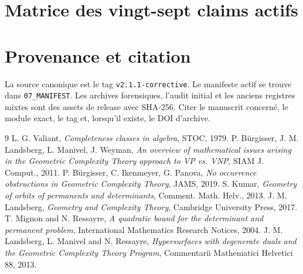 \documentclass[10pt]{article}
\begin{document}
\section{Matrice des vingt-sept claims actifs}
\small

\normalsize

\section{Provenance et citation}
La source canonique est le tag \texttt{v2.1.1-corrective}. Le manifeste actif se trouve dans \texttt{07\_MANIFEST}. Les archives forensiques, l'audit initial et les anciens registres mixtes sont des assets de release avec SHA-256. Citer le manuscrit concerné, le module exact, le tag et, lorsqu'il existe, le DOI d'archive.

\begin{thebibliography}{9}
 L. G. Valiant, \emph{Completeness classes in algebra}, STOC, 1979.
 P. Bürgisser, J. M. Landsberg, L. Manivel, J. Weyman, \emph{An overview of mathematical issues arising in the Geometric Complexity Theory approach to VP vs. VNP}, SIAM J. Comput., 2011.
 P. Bürgisser, C. Ikenmeyer, G. Panova, \emph{No occurrence obstructions in Geometric Complexity Theory}, JAMS, 2019.
 S. Kumar, \emph{Geometry of orbits of permanents and determinants}, Comment. Math. Helv., 2013.
 J. M. Landsberg, \emph{Geometry and Complexity Theory}, Cambridge University Press, 2017.
T. Mignon and N. Ressayre,
\emph{A quadratic bound for the determinant and permanent problem},
International Mathematics Research Notices, 2004.
J. M. Landsberg, L. Manivel and N. Ressayre,
\emph{Hypersurfaces with degenerate duals and the Geometric Complexity Theory Program},
Commentarii Mathematici Helvetici 88, 2013.
\end{thebibliography}
\end{document}
